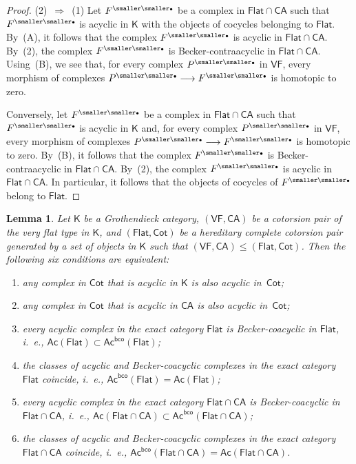 \documentclass[12pt,a4paper]{amsart}
\newcommand{\+}{\nobreakdash-}
\renewcommand{\:}{\colon}
\newcommand{\rarrow}{\longrightarrow}
\newcommand{\bu}{{\text{\smaller\smaller$\scriptstyle\bullet$}}}
\newcommand{\sK}{\mathsf K}
\newcommand{\VF}{\mathsf{VF}}
\newcommand{\CA}{\mathsf{CA}}
\newcommand{\Flat}{\mathsf{Flat}}
\newcommand{\Cot}{\mathsf{Cot}}
\newcommand{\Ac}{\mathsf{Ac}}
\newcommand{\bco}{\mathsf{bco}}
\theoremstyle{plain}
\newtheorem{lem}[thm]{Lemma}
\theoremstyle{definition}
\begin{document}
\begin{proof}
 (2)~$\Longrightarrow$~(1) Let $F^\bu$ be a complex in $\Flat\cap\CA$
such that $F^\bu$ is acyclic in $\sK$ with the objects of cocycles
belonging to $\Flat$.
 By~(A), it follows that the complex $F^\bu$ is acyclic in
$\Flat\cap\CA$.
 By~(2), the complex $F^\bu$ is Becker-contraacyclic in $\Flat\cap\CA$.
 Using~(B), we see that, for every complex $P^\bu$ in $\VF$, every
morphism of complexes $P^\bu\rarrow F^\bu$ is homotopic to zero.

 Conversely, let $F^\bu$ be a complex in $\Flat\cap\CA$ such that
$F^\bu$ is acyclic in $\sK$ and, for every complex $P^\bu$ in $\VF$,
every morphism of complexes $P^\bu\rarrow F^\bu$ is homotopic to zero.
 By~(B), it follows that the complex $F^\bu$ is Becker-contraacyclic
in $\Flat\cap\CA$.
 By~(2), the complex $F^\bu$ is acyclic in $\Flat\cap\CA$.
 In particular, it follows that the objects of cocycles of $F^\bu$
belong to $\Flat$.
\end{proof}

\begin{lem} \label{ac=ac-bco-equivalent-conditions}
 Let\/ $\sK$ be a Grothendieck category, $(\VF,\CA)$ be a cotorsion pair
of the very flat type in\/ $\sK$, and $(\Flat,\Cot)$ be a hereditary
complete cotorsion pair generated by a set of objects in\/ $\sK$
such that $(\VF,\CA)\le(\Flat,\Cot)$.
 Then the following six conditions are equivalent:
\begin{enumerate}
\item any complex in\/ $\Cot$ that is acyclic in\/ $\sK$ is also
acyclic in\/~$\Cot$;
\item any complex in\/ $\Cot$ that is acyclic in\/ $\CA$ is also
acyclic in\/~$\Cot$;
\item every acyclic complex in the exact category\/ $\Flat$ is
Becker-coacyclic in\/ $\Flat$, i.~e.,
$\Ac(\Flat)\subset\Ac^\bco(\Flat)$;
\item the classes of acyclic and Becker-coacyclic complexes in
the exact category\/ $\Flat$ coincide, i.~e.,
$\Ac^\bco(\Flat)=\Ac(\Flat)$;
\item every acyclic complex in the exact category\/ $\Flat\cap\CA$ is
Becker-coacyclic in\/ $\Flat\cap\CA$, i.~e.,
$\Ac(\Flat\cap\CA)\subset\Ac^\bco(\Flat\cap\CA)$;
\item the classes of acyclic and Becker-coacyclic complexes in
the exact category\/ $\Flat\cap\CA$ coincide, i.~e.,
$\Ac^\bco(\Flat\cap\CA)=\Ac(\Flat\cap\CA)$.
\end{enumerate}
\end{lem}
\end{document}
